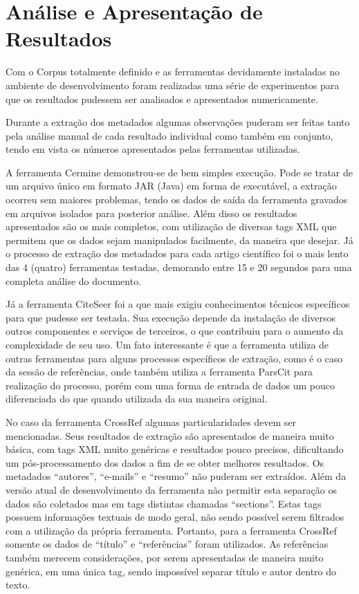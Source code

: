 
\chapter{Análise e Apresentação de Resultados}



Com o Corpus totalmente definido e as ferramentas devidamente instaladas no ambiente de desenvolvimento foram realizadas uma série de experimentos para que os resultados pudessem ser analisados e apresentados numericamente.


Durante a extração dos metadados algumas observações puderam ser feitas tanto pela análise manual de cada resultado individual como também em conjunto, tendo em vista os números apresentados pelas ferramentas utilizadas.

A ferramenta Cermine demonstrou-se de bem simples execução. Pode se tratar de um arquivo único em formato JAR (Java) em forma de executável, a extração ocorreu sem maiores problemas, tendo os dados de saída da ferramenta gravados em arquivos isolados para posterior análise. Além disso os resultados apresentados são os mais completos, com utilização de diversas tags XML que permitem que os dados sejam manipulados facilmente, da maneira que desejar. Já o processo de extração dos metadados para cada artigo científico foi o mais lento das 4 (quatro) ferramentas testadas, demorando entre 15 e 20 segundos para uma completa análise do documento.

Já a ferramenta CiteSeer foi a que mais exigiu conhecimentos técnicos específicos para que pudesse ser testada. Sua execução depende da instalação de diversos outros componentes e serviços de terceiros, o que contribuiu para o aumento da complexidade de seu uso. Um fato interessante é que a ferramenta utiliza de outras ferramentas para alguns processos específicos de extração, como é o caso da sessão de referências, onde também utiliza a ferramenta ParsCit para realização do processo, porém com uma forma de entrada de dados um pouco diferenciada do que quando utilizada da sua maneira original.

No caso da ferramenta CrossRef algumas particularidades devem ser mencionadas. Seus resultados de extração são apresentados de maneira muito básica, com tags XML muito genéricas e resultados pouco precisos, dificultando um pós-processamento dos dados a fim de se obter melhores resultados. Os metadados ``autores'', ``e-mails'' e ``resumo'' não puderam ser extraídos. Além da versão atual de desenvolvimento da ferramenta não permitir esta separação os dados são coletados mas em tags distintas chamadas ``sections''. Estas tags possuem informações textuais de modo geral, não sendo possível serem filtrados com a utilização da própria ferramenta. Portanto, para a ferramenta CrossRef somente os dados de ``título'' e ``referências'' foram utilizados. As referências também merecem considerações, por serem apresentadas de maneira muito genérica, em uma única tag, sendo impossível separar título e autor dentro do texto.

